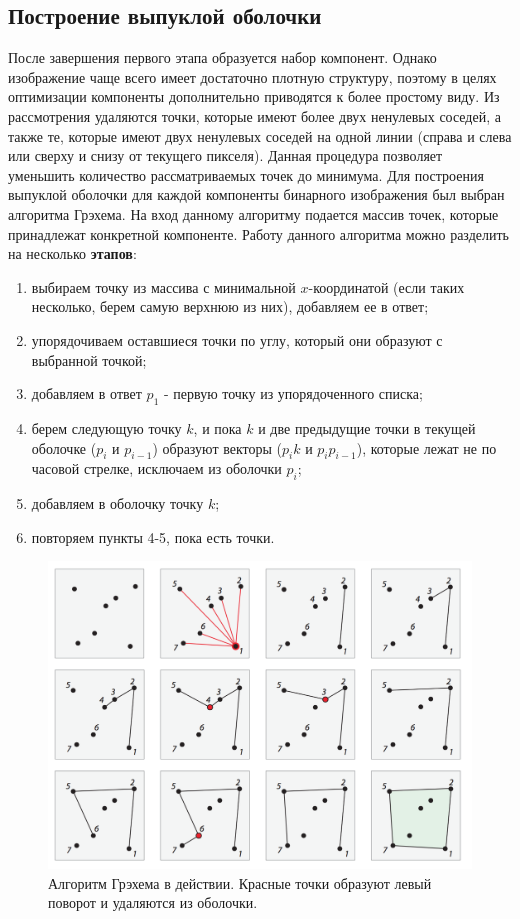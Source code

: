 \subsection{Построение выпуклой оболочки}
После завершения первого этапа образуется набор компонент. Однако изображение чаще всего имеет достаточно плотную структуру, поэтому в целях оптимизации компоненты дополнительно приводятся к более простому виду. Из рассмотрения удаляются точки, которые имеют более двух ненулевых соседей, а также те, которые имеют двух ненулевых соседей на одной линии (справа и слева или сверху и снизу от текущего пикселя). Данная процедура позволяет уменьшить количество рассматриваемых точек до минимума.\n
Для построения выпуклой оболочки для каждой компоненты бинарного изображения был выбран алгоритма Грэхема. На вход данному алгоритму подается массив точек, которые принадлежат конкретной компоненте.\n
Работу данного алгоритма можно разделить на несколько \textbf{этапов}:
\begin{enumerate}
	\item выбираем точку из массива с минимальной $x$-координатой (если таких несколько, берем самую верхнюю из них), добавляем ее в ответ;
	\item упорядочиваем оставшиеся точки по углу, который они образуют с выбранной точкой;
	\item добавляем в ответ $p_1$ - первую точку из упорядоченного списка;
	\item берем следующую точку $k$, и пока $k$ и две предыдущие точки в текущей оболочке ($p_i$ и $p_{i−1}$) образуют векторы ($p_i$$k$ и $p_i$$p_{i−1}$), которые лежат не по часовой стрелке, исключаем из оболочки $p_i$;
	\item добавляем в оболочку точку $k$;
	\item повторяем пункты 4-5, пока есть точки.
\end{enumerate}
\begin{figure}[H]
	\centering
	\includegraphics[width=\linewidth]{img/graham}
	\caption{Алгоритм Грэхема в действии. Красные точки образуют левый поворот и удаляются из оболочки.}
	\label{fig:graham}
\end{figure}
